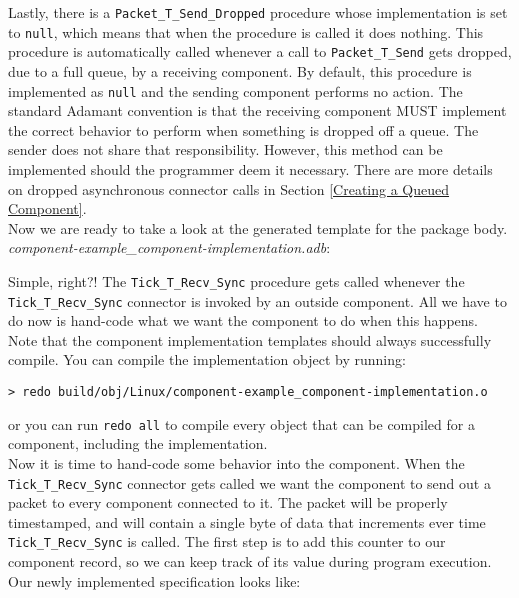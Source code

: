 Lastly, there is a \texttt{Packet\_T\_Send\_Dropped} procedure whose implementation is set to \texttt{null}, which means that when the procedure is called it does nothing. This procedure is automatically called whenever a call to \texttt{Packet\_T\_Send} gets dropped, due to a full queue, by a receiving component. By default, this procedure is implemented as \texttt{null} and the sending component performs no action. The standard Adamant convention is that the receiving component MUST implement the correct behavior to perform when something is dropped off a queue. The sender does not share that responsibility. However, this method can be implemented should the programmer deem it necessary. There are more details on dropped asynchronous connector calls in Section \ref{Creating a Queued Component}. \\

Now we are ready to take a look at the generated template for the package body. \\

\textit{component-example\_component-implementation.adb}:

Simple, right?! The \texttt{Tick\_T\_Recv\_Sync} procedure gets called whenever the \texttt{Tick\_T\_Recv\_Sync} connector is invoked by an outside component. All we have to do now is hand-code what we want the component to do when this happens. \\

Note that the component implementation templates should always successfully compile. You can compile the implementation object by running:

\vspace{5mm} %
\begin{verbatim}
> redo build/obj/Linux/component-example_component-implementation.o
\end{verbatim}
\vspace{5mm} %

or you can run \texttt{redo all} to compile every object that can be compiled for a component, including the implementation. \\

Now it is time to hand-code some behavior into the component. When the \texttt{Tick\_T\_Recv\_Sync} connector gets called we want the component to send out a packet to every component connected to it. The packet will be properly timestamped, and will contain a single byte of data that increments ever time \texttt{Tick\_T\_Recv\_Sync} is called. The first step is to add this counter to our component record, so we can keep track of its value during program execution. Our newly implemented specification looks like: \\

